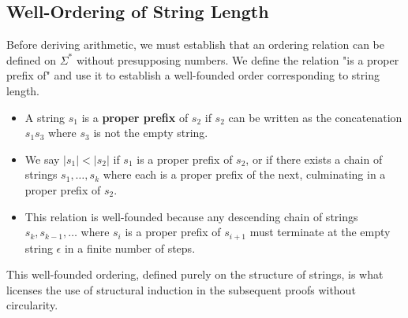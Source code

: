\documentclass[12pt, a4paper]{article}
\begin{document}
\subsection{Well-Ordering of String Length}
Before deriving arithmetic, we must establish that an ordering relation can be defined on \(\Sigma^*\) without presupposing numbers. We define the relation "is a proper prefix of" and use it to establish a well-founded order corresponding to string length.
\begin{itemize}
    \item A string \(s_1\) is a \textbf{proper prefix} of \(s_2\) if \(s_2\) can be written as the concatenation \(s_1s_3\) where \(s_3\) is not the empty string.
    \item We say \(|s_1| < |s_2|\) if \(s_1\) is a proper prefix of \(s_2\), or if there exists a chain of strings \(s_1, \dots, s_k\) where each is a proper prefix of the next, culminating in a proper prefix of \(s_2\).
    \item This relation is well-founded because any descending chain of strings \(s_k, s_{k-1}, \dots\) where \(s_{i}\) is a proper prefix of \(s_{i+1}\) must terminate at the empty string \(\epsilon\) in a finite number of steps.
\end{itemize}
This well-founded ordering, defined purely on the structure of strings, is what licenses the use of structural induction in the subsequent proofs without circularity.
\end{document}

